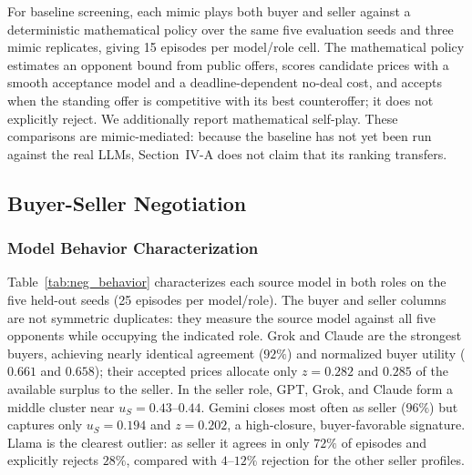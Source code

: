 For baseline screening, each mimic plays both buyer and seller against a deterministic mathematical policy over the same five evaluation seeds and three mimic replicates, giving 15 episodes per model/role cell. The mathematical policy estimates an opponent bound from public offers, scores candidate prices with a smooth acceptance model and a deadline-dependent no-deal cost, and accepts when the standing offer is competitive with its best counteroffer; it does not explicitly reject. We additionally report mathematical self-play. These comparisons are mimic-mediated: because the baseline has not yet been run against the real LLMs, Section~IV-A does not claim that its ranking transfers.



\subsection{Buyer-Seller Negotiation}

\subsubsection{Model Behavior Characterization}

Table~\ref{tab:neg_behavior} characterizes each source model in both roles on the five held-out seeds (25 episodes per model/role). The buyer and seller columns are not symmetric duplicates: they measure the source model against all five opponents while occupying the indicated role. Grok and Claude are the strongest buyers, achieving nearly identical agreement ($92\%$) and normalized buyer utility ($0.661$ and $0.658$); their accepted prices allocate only $z=0.282$ and $0.285$ of the available surplus to the seller. In the seller role, GPT, Grok, and Claude form a middle cluster near $u_S=0.43$--$0.44$. Gemini closes most often as seller ($96\%$) but captures only $u_S=0.194$ and $z=0.202$, a high-closure, buyer-favorable signature. Llama is the clearest outlier: as seller it agrees in only $72\%$ of episodes and explicitly rejects $28\%$, compared with $4$--$12\%$ rejection for the other seller profiles.

